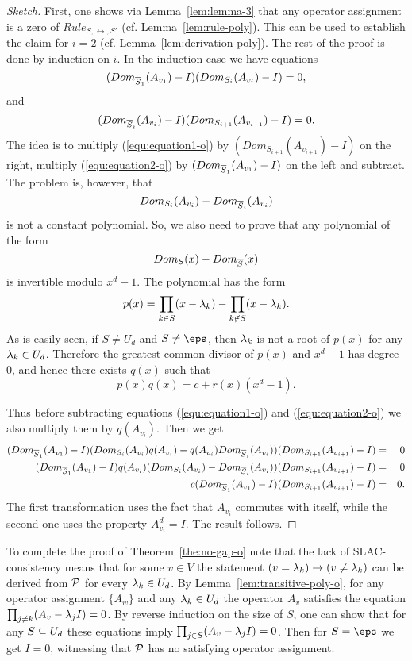\documentclass[11pt,letter]{article}
\begin{document}
\begin{proof}[Sketch]
First, one shows via Lemma~\ref{lem:lemma-3} that any operator assignment is a zero of $Rule_{S,\rel,S'}$
(cf. Lemma~\ref{lem:rule-poly}). This can be used to establish the claim for
  $i=2$ (cf. Lemma~\ref{lem:derivation-poly}).
The rest of the proof is done by induction on $i$. 
In the induction case we have equations
\begin{equation}\label{equ:equation1-o}
(Dom_{\overline S_1}(A_{v_1})-I)(Dom_{S_i}(A_{v_i})-I)=0,
\end{equation}
and 
\begin{equation}\label{equ:equation2-o}
(Dom_{\overline S_i}(A_{v_i})-I)(Dom_{S_{i+1}}(A_{v_{i+1}})-I)=0.
\end{equation}
The idea is to multiply (\ref{equ:equation1-o}) by 
$(Dom_{S_{i+1}}(A_{v_{i+1}})-I)$ on the right, multiply (\ref{equ:equation2-o})
by $(Dom_{\overline S_1}(A_{v_1})-I)$ on the left and subtract. The problem
is, however, that 
\[
Dom_{S_i}(A_{v_i})-Dom_{\overline S_i}(A_{v_i})
\]
is not a constant polynomial. So, we also need to prove that any polynomial
of the form 
\[
Dom_S(x)-Dom_{\overline S}(x)
\]
is invertible modulo $x^d-1$. The polynomial has the form
\[
p(x)=\prod_{k\in S}(x-\lambda_k)-\prod_{k\not\in S}(x-\lambda_k).
\]
As is easily seen, if $S\ne U_d$ and $S\ne\eps$, then $\lambda_k$ is not a
root of $p(x)$ for any $\lambda_k\in U_d$. Therefore the greatest common divisor of $p(x)$ and $x^d-1$ has degree 0, and hence there exists $q(x)$ such that 
\[
p(x)q(x)=c+r(x)(x^d-1).
\]

Thus before subtracting equations (\ref{equ:equation1-o}) and 
(\ref{equ:equation2-o}) we also multiply them by $q(A_{v_i})$. Then we get
\begin{eqnarray*}
(Dom_{\overline S_1}(A_{v_1})-I)(Dom_{S_i}(A_{v_i})q(A_{v_i})
-q(A_{v_i})Dom_{\overline S_i}(A_{v_i}))(Dom_{S_{i+1}}(A_{v_{i+1}})-I) &=& 0\\
(Dom_{\overline S_1}(A_{v_1})-I)q(A_{v_i})(Dom_{S_i}(A_{v_i})
-Dom_{\overline S_i}(A_{v_i}))(Dom_{S_{i+1}}(A_{v_{i+1}})-I) &=& 0\\
c(Dom_{\overline S_1}(A_{v_1})-I)(Dom_{S_{i+1}}(A_{v_{i+1}})-I) &=& 0.
\end{eqnarray*}
The first transformation uses the fact that $A_{v_i}$ commutes with itself, while the 
second one uses the property $A_{v_i}^d=I$.
The result follows.
\end{proof}

To complete the proof of Theorem~\ref{the:no-gap-o} note that the lack of
SLAC-consistency means that for some $v\in V$ the statement 
$(v=\lambda_k)\to(v\ne\lambda_k)$ can be derived from ${\mathcal P}$ for every $\lambda_k\in U_d$.
By Lemma~\ref{lem:transitive-poly-o}, for any operator assignment $\{A_w\}$
and any $\lambda_k\in U_d$ the operator $A_v$ satisfies the equation
$\prod_{j\ne k}(A_v-\lambda_jI)=0$.
By reverse induction on the size of $S$, one can show that for any $S\subseteq U_d$ these equations imply 
$\prod_{j\in S}(A_v-\lambda_jI)=0$.
Then for $S=\eps$ we get $I=0$, witnessing that ${\mathcal P}$ has no satisfying 
operator assignment. 
\end{document}
